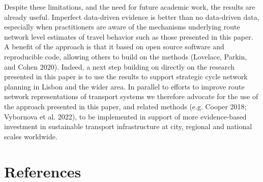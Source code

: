 \documentclass{isprs} %
\begin{document}
Despite these limitations, and the need for future academic work, the results are already useful.
Imperfect data-driven evidence is better than no data-driven data, especially when practitioners are aware of the mechanisms underlying route network level estimates of travel behavior such as those presented in this paper.
A benefit of the approach is that it based on open source software and reproducible code, allowing others to build on the methods (Lovelace, Parkin, and Cohen 2020).
Indeed, a next step building on directly on the research presented in this paper is to use the results to support strategic cycle network planning in Lisbon and the wider area.
In parallel to efforts to improve route network representations of transport systems we therefore advocate for the use of the approach presented in this paper, and related methods (e.g. Cooper 2018; Vybornova et al. 2022), to be implemented in support of more evidence-based investment in sustainable transport infrastructure at city, regional and national scales worldwide.

\hypertarget{references}{%
\section*{References}\label{references}}
\end{document}
